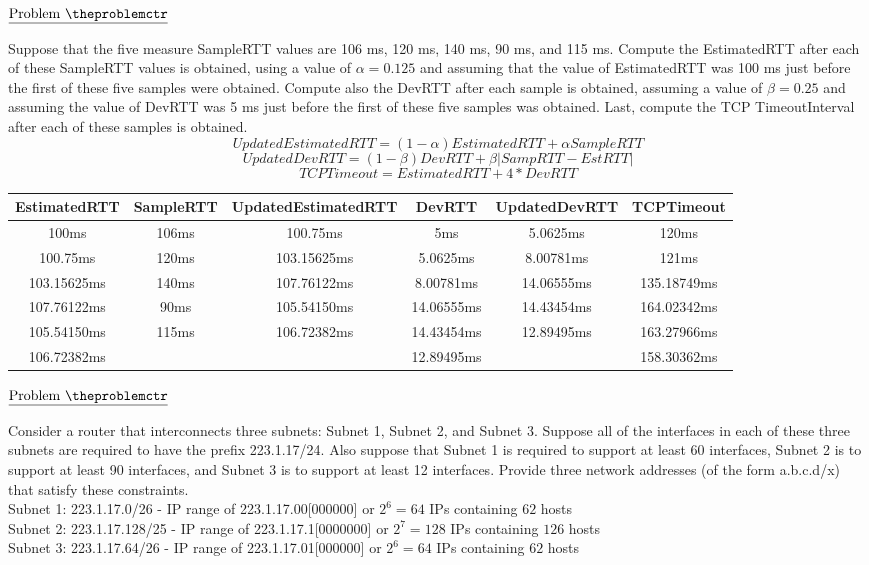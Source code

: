 \documentclass[11pt]{article}
\def\pp{\par\noindent}
\begin{document}
\addtocounter{problemctr}{1}
\bigskip
\noindent
$\underline{\rm Problem\ \theproblemctr}$\pp
Suppose that the five measure SampleRTT values are 106 ms, 120 ms, 140 ms, 90 ms, and 115 ms. Compute the EstimatedRTT after each of these SampleRTT values is obtained, using a value of $\alpha=0.125$ and assuming that the value of EstimatedRTT was 100 ms just before the first of these five samples were obtained. Compute also the DevRTT after each sample is obtained, assuming a value of $\beta=0.25$ and assuming the value of DevRTT was 5 ms just before the first of these five samples was obtained. Last, compute the TCP TimeoutInterval after each of these samples is obtained.
$$UpdatedEstimatedRTT=(1-\alpha)EstimatedRTT+\alpha SampleRTT$$
$$UpdatedDevRTT=(1-\beta)DevRTT+\beta|SampRTT-EstRTT|$$
$$TCPTimeout=EstimatedRTT+4*DevRTT$$
\begin{tabular}{|c|c|c|c|c|c|}
    \hline
    EstimatedRTT & SampleRTT & UpdatedEstimatedRTT & DevRTT & UpdatedDevRTT & TCPTimeout\\
    \hline
    100ms & 106ms & 100.75ms & 5ms & 5.0625ms & 120ms\\
    \hline
    100.75ms & 120ms & 103.15625ms & 5.0625ms & 8.00781ms & 121ms\\
    \hline
    103.15625ms& 140ms & 107.76122ms & 8.00781ms & 14.06555ms& 135.18749ms\\
    \hline
    107.76122ms& 90ms & 105.54150ms & 14.06555ms & 14.43454ms & 164.02342ms\\
    \hline
    105.54150ms& 115ms & 106.72382ms & 14.43454ms & 12.89495ms & 163.27966ms\\
    \hline
    106.72382ms & & & 12.89495ms & & 158.30362ms\\
    \hline
\end{tabular}

\addtocounter{problemctr}{1}
\bigskip
\noindent
$\underline{\rm Problem\ \theproblemctr}$\pp
Consider a router that interconnects three subnets: Subnet 1, Subnet 2, and Subnet 3. Suppose all of the interfaces in each of these three subnets are required to have the prefix 223.1.17/24. Also suppose that Subnet 1 is required to support at least 60 interfaces, Subnet 2 is to support at least 90 interfaces, and Subnet 3 is to support at least 12 interfaces. Provide three network addresses (of the form a.b.c.d/x) that satisfy these constraints.\\
Subnet 1: 223.1.17.0/26 - IP range of 223.1.17.00[000000] or $2^6=64$ IPs containing $62$ hosts\\
Subnet 2: 223.1.17.128/25 - IP range of 223.1.17.1[0000000] or $2^7=128$ IPs containing $126$ hosts\\
Subnet 3: 223.1.17.64/26 - IP range of 223.1.17.01[000000] or $2^6=64$ IPs containing $62$ hosts\\
\end{document}
